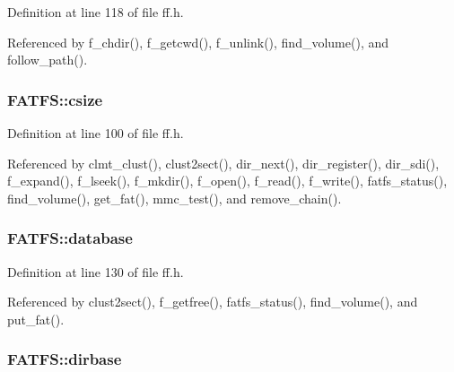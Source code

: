 Definition at line 118 of file ff.\+h.



Referenced by f\+\_\+chdir(), f\+\_\+getcwd(), f\+\_\+unlink(), find\+\_\+volume(), and follow\+\_\+path().

\subsubsection[{\texorpdfstring{csize}{csize}}]{ F\+A\+T\+F\+S\+::csize}\hypertarget{structFATFS_ad7fa7a509f8d097a9ab182d6c47be568}{}\label{structFATFS_ad7fa7a509f8d097a9ab182d6c47be568}


Definition at line 100 of file ff.\+h.



Referenced by clmt\+\_\+clust(), clust2sect(), dir\+\_\+next(), dir\+\_\+register(), dir\+\_\+sdi(), f\+\_\+expand(), f\+\_\+lseek(), f\+\_\+mkdir(), f\+\_\+open(), f\+\_\+read(), f\+\_\+write(), fatfs\+\_\+status(), find\+\_\+volume(), get\+\_\+fat(), mmc\+\_\+test(), and remove\+\_\+chain().

\subsubsection[{\texorpdfstring{database}{database}}]{ F\+A\+T\+F\+S\+::database}\hypertarget{structFATFS_a5b6c0bc2e9fd2ae8ef714210a74a2d5d}{}\label{structFATFS_a5b6c0bc2e9fd2ae8ef714210a74a2d5d}


Definition at line 130 of file ff.\+h.



Referenced by clust2sect(), f\+\_\+getfree(), fatfs\+\_\+status(), find\+\_\+volume(), and put\+\_\+fat().

\subsubsection[{\texorpdfstring{dirbase}{dirbase}}]{ F\+A\+T\+F\+S\+::dirbase}\hypertarget{structFATFS_a3f72fd998dbcce4652a85a81fe944bc4}{}\label{structFATFS_a3f72fd998dbcce4652a85a81fe944bc4}


